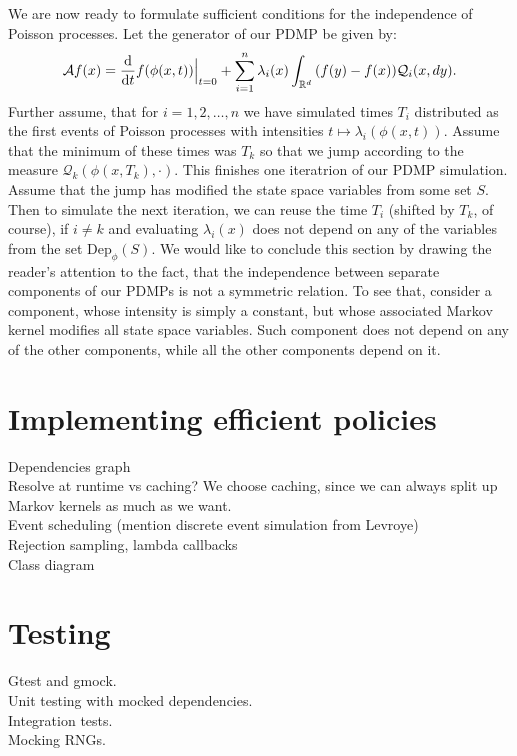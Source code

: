 \documentclass[report.tex]{subfiles}
\begin{document}
We are now ready to formulate sufficient conditions
for the independence of Poisson processes. Let the generator of our PDMP be given
by:
\begin{equation*}
  \mathcal{A}f(x) =
  \dv{}{t}f(\phi(x, t)) \Bigr|_{t = 0} +
  \sum_{i=1}^{n} \lambda_{i}(x)\int_{{\mathbb{R}^{d}}}^{{}} {}{(f(y) - f(x))\mathcal{Q}_{i}(x, dy)}.
\end{equation*}
Further assume, that for $i = 1, 2, \dots, n$
we have simulated times $T_{i}$ distributed as the first events of Poisson processes
with intensities $t \mapsto \lambda_{i}(\phi(x, t))$.
Assume that the minimum of these times was $T_{k}$ so that we jump according
to the measure $\mathcal{Q}_{k}(\phi(x, T_{k}), \cdot)$.
This finishes one iteratrion of our PDMP simulation.
Assume that the jump has modified the state space variables from some set
$S$. Then to simulate the next iteration, we can reuse the time $T_{i}$ (shifted by $T_{k}$, of course),
if $i \neq k$ and evaluating $\lambda_{i}(x)$ does not depend on any of the variables from the
set $\text{Dep}_{\phi}(S)$. We would like to conclude this section by drawing the
reader's attention to the fact, that the independence between separate components
of our PDMPs is not a symmetric relation. To see that, consider a component, whose
intensity is simply a constant, but whose associated Markov kernel modifies all
state space variables. Such component does not depend on any of the other components,
while all the other components depend on it.


\section{Implementing efficient policies}
\label{efficient-policies-implementation}



Dependencies graph\\
Resolve at runtime vs caching? We choose caching, since we can always split up Markov kernels as much as we want.\\
Event scheduling (mention discrete event simulation from Levroye)\\
Rejection sampling, lambda callbacks\\
Class diagram

\section{Testing}

Gtest and gmock. \\
Unit testing with mocked dependencies. \\
Integration tests. \\
Mocking RNGs.
\end{document}
